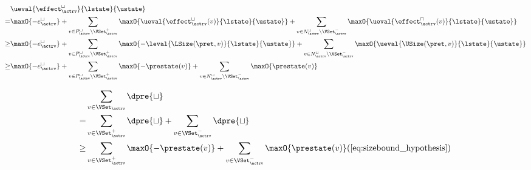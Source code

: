 \begin{equation} \label{eq:input_rv_reduction_lower}
  \begin{split}
  & \ueval{\effect^\sqcup_\actrv}{\lstate}{\ustate} \\
  = & \maxO{-e^{\sqcup}_\actrv}
    + \sum_{v \in P_\actrv^\sqcup \setminus \VSet^+_\actrv} \maxO{\ueval{\effect^\sqcup_\actrv(v)}{\lstate}{\ustate}}
    + \sum_{v \in N_\actrv^\sqcup \setminus \VSet^-_\actrv} \maxO{\ueval{\effect^\sqcap_\actrv(v)}{\lstate}{\ustate}} \\
  \geq & \maxO{-e^{\sqcup}_\actrv}
    + \sum_{v \in P_\actrv^\sqcup \setminus \VSet^+_\actrv} \maxO{-\leval{\LSize(\pret, v)}{\lstate}{\ustate}}
    + \sum_{v \in N_\actrv^\sqcup \setminus \VSet^-_\actrv} \maxO{\ueval{\USize(\pret, v)}{\lstate}{\ustate}} \\
  \geq & \maxO{-e^{\sqcup}_\actrv}
    + \sum_{v \in P_\actrv^\sqcup \setminus \VSet^+_\actrv} \maxO{-\prestate(v)}
    + \sum_{v \in N_\actrv^\sqcup \setminus \VSet^-_\actrv} \maxO{\prestate(v)} \\
  \end{split}
\end{equation}

\begin{equation} \label{eq:d_lower_reduction}
  \begin{split} 
  & \sum_{v \in \VSet_\actrv} \dpre{\sqcup} \\
  = & \sum_{v \in \VSet^+_\actrv} \dpre{\sqcup} + \sum_{v \in \VSet^-_\actrv} \dpre{\sqcup} \\
  \geq & \sum_{v \in \VSet^+_\actrv} \maxO{-\prestate(v)} + \sum_{v \in \VSet^-_\actrv} \maxO{\prestate(v)} (\ref{eq:sizebound_hypothesis}) \\
  \end{split}      
\end{equation}

